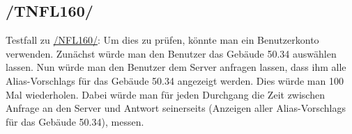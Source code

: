 \subsection*{/TNFL160/}
\label{/TNFL160/} Testfall zu \hyperref[/NFL160/]{/NFL160/}: Um dies zu prüfen, könnte man ein \Gls{Benutzer}konto verwenden. Zunächst würde man den \Gls{Benutzer} das Gebäude 50.34 auswählen lassen. Nun würde man den \Gls{Benutzer} dem \Gls{Server} anfragen lassen, dass ihm alle \Glspl{Alias-Vorschlag} für das Gebäude 50.34 angezeigt werden. Dies würde man 100 Mal wiederholen. Dabei würde man für jeden Durchgang die Zeit zwischen Anfrage an den \Gls{Server} und Antwort seinerseits (Anzeigen aller \Glspl{Alias-Vorschlag} für das Gebäude 50.34), messen.
